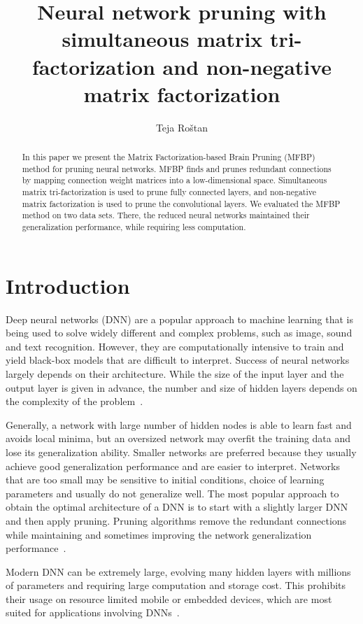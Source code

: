 \documentclass{article} %
\title{Neural network pruning with simultaneous matrix tri-factorization and non-negative matrix factorization}
\author{Teja Ro\v{s}tan}
\begin{document}
\maketitle

\begin{abstract}

In this paper we present the Matrix Factorization-based Brain Pruning (MFBP) method for 
pruning neural networks. MFBP finds and prunes redundant connections by mapping connection
weight matrices into a low-dimensional space. Simultaneous matrix tri-factorization is 
used to prune fully connected layers, and non-negative matrix factorization is used 
to prune the convolutional layers. We evaluated the MFBP method on two data sets. There, 
the reduced neural networks maintained their generalization performance, while requiring 
less computation.

\end{abstract}

\section{Introduction}

Deep neural networks (DNN) are a popular approach to machine learning that is being used 
to solve widely different and complex problems, such as image, sound and text recognition.
However, they are computationally intensive to train and yield black-box models that are 
difficult to interpret. Success of neural networks largely depends on their architecture. 
While the size of the input layer and the output layer is given in advance, the number and
size of hidden layers depends on the complexity of the problem~\cite{augasta2013pruning}. 

Generally, a network with large number of hidden nodes is able to learn fast and avoids
local minima, but an oversized network may overfit the training data and lose its 
generalization ability. Smaller networks are preferred because they usually achieve good 
generalization performance and are easier to interpret. Networks that are too small may be
sensitive to initial conditions, choice of learning parameters and usually do not 
generalize well. The most popular approach to obtain the optimal architecture of a DNN is 
to start with a slightly larger DNN and then apply pruning. Pruning algorithms remove the 
redundant connections while maintaining and sometimes improving the network generalization
performance~\cite{augasta2013pruning}.

Modern DNN can be extremely large, evolving many hidden layers with millions of parameters
and requiring large computation and storage cost. This prohibits their usage on resource 
limited mobile or embedded devices, which are most suited for applications involving 
DNNs~\cite{DBLP:journals/corr/GongLYB14}.
\end{document}
